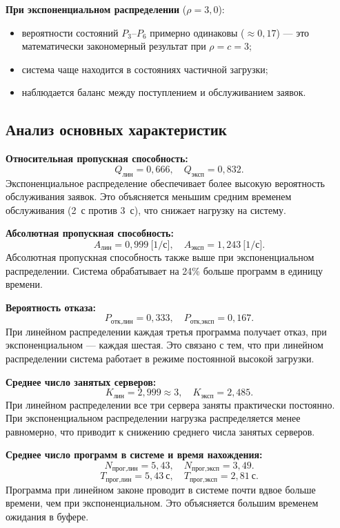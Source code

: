 \documentclass[14pt,a4paper]{extarticle}
\begin{document}
\textbf{При экспоненциальном распределении} ($\rho = 3{,}0$):
\begin{itemize}
  \item вероятности состояний $P_3$--$P_6$ примерно одинаковы ($\approx 0{,}17$)
        --- это математически закономерный результат при $\rho = c = 3$;
  \item система чаще находится в состояниях частичной загрузки;
  \item наблюдается баланс между поступлением и обслуживанием заявок.
\end{itemize}

\subsection{Анализ основных характеристик}

\textbf{Относительная пропускная способность:}
\[
  Q_{\text{лин}} = 0{,}666, \quad Q_{\text{эксп}} = 0{,}832.
\]
Экспоненциальное распределение обеспечивает более высокую вероятность
обслуживания заявок. Это объясняется меньшим средним временем обслуживания
(2~с против 3~с), что снижает нагрузку на систему.

\textbf{Абсолютная пропускная способность:}
\[
  A_{\text{лин}} = 0{,}999\ \text{[1/с]}, \quad
  A_{\text{эксп}} = 1{,}243\ \text{[1/с]}.
\]
Абсолютная пропускная способность также выше при экспоненциальном распределении.
Система обрабатывает на 24\% больше программ в единицу времени.

\textbf{Вероятность отказа:}
\[
  P_{\text{отк,лин}} = 0{,}333, \quad P_{\text{отк,эксп}} = 0{,}167.
\]
При линейном распределении каждая третья программа получает отказ, при
экспоненциальном --- каждая шестая. Это связано с тем, что при линейном
распределении система работает в режиме постоянной высокой загрузки.

\textbf{Среднее число занятых серверов:}
\[
  K_{\text{лин}} = 2{,}999 \approx 3, \quad K_{\text{эксп}} = 2{,}485.
\]
При линейном распределении все три сервера заняты практически постоянно.
При экспоненциальном распределении нагрузка распределяется менее равномерно,
что приводит к снижению среднего числа занятых серверов.

\textbf{Среднее число программ в системе и время нахождения:}
\[
  N_{\text{прог,лин}} = 5{,}43, \quad N_{\text{прог,эксп}} = 3{,}49.
\]
\[
  T_{\text{прог,лин}} = 5{,}43\ \text{с}, \quad T_{\text{прог,эксп}} = 2{,}81\ \text{с}.
\]
Программа при линейном законе проводит в системе почти вдвое больше времени,
чем при экспоненциальном. Это объясняется большим временем ожидания в буфере.
\end{document}
